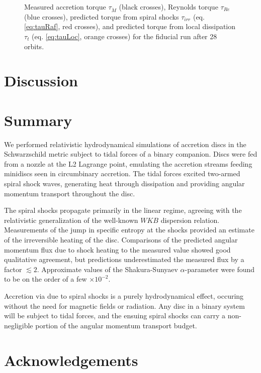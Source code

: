 \documentclass{emulateapj}
\newcommand{\al}{\alpha}
\begin{document}
\begin{figure}
	\caption{\label{fi:torque} Measured accretion torque $\tau_{\dot{M}}$ (black crosses), Reynolds torque $\tau_{Re}$ (blue crosses), predicted torque from spiral shocks $\tau_{irr}$ (eq. \eqref{eq:tauRaf}, red crosses), and predicted torque from local dissipation $\tau_t$ (eq. \eqref{eq:tauLoc}, orange crosses) for the fiducial run after 28 orbits.}  
\end{figure}


\section{Discussion}
\label{sec:discussion}




\section{Summary}
\label{sec:summary}

We performed relativistic hydrodynamical simulations of accretion discs in the Schwarzschild metric subject to tidal forces of a binary companion.  Discs were fed from a nozzle at the L2 Lagrange point, emulating the accretion streams feeding minidiscs seen in circumbinary accretion.  The tidal forces excited two-armed spiral shock waves,  generating heat through dissipation and providing angular momentum transport throughout the disc.

The spiral shocks propagate primarily in the linear regime, agreeing with the relativistic generalization of the well-known $WKB$ dispersion relation.  Measurements of the jump in specific entropy at the shocks provided an estimate of the irreversible heating of the disc.  Comparisons of the predicted angular momentum flux due to shock heating to the measured value showed good qualitative agreement, but predictions underestimated the measured flux by a factor $\lesssim 2$.  Approximate values of the Shakura-Sunyaev $\al$-parameter were found to be on the order of a few $\times 10^{-2}$.

Accretion via due to spiral shocks is a purely hydrodynamical effect, occuring without the need for magnetic fields or radiation.  Any disc in a binary system will be subject to tidal forces, and the ensuing spiral shocks can carry a non-negligible portion of the angular momentum transport budget.  


\section{Acknowledgements}


\newpage





%
\end{document}
